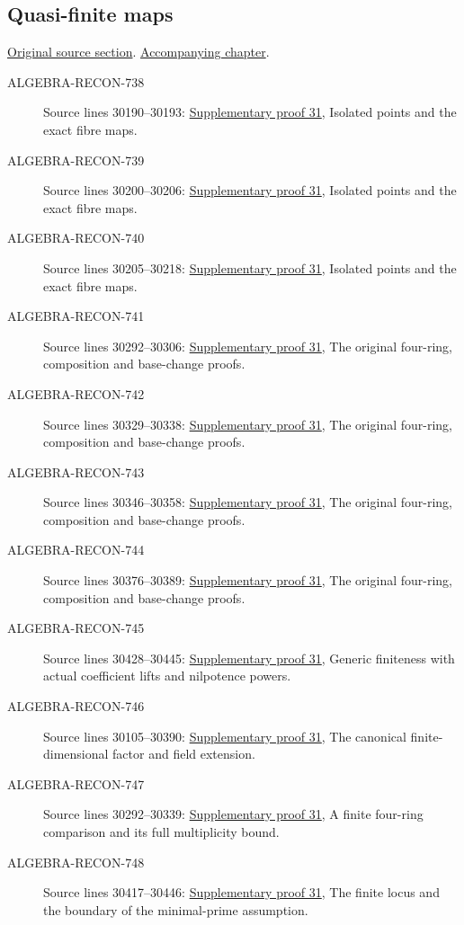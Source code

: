 \subsection{Quasi-finite maps}
\hypertarget{algebra-source-section-quasi-finite}{}
\noindent\href{https://github.com/stacks/stacks-project/blob/a04446e57ec1fbc252a871afcec7752fb2807b14/algebra.tex\#L30093}{Original source section}. \href{algebra.pdf\#nameddest=section-quasi-finite}{Accompanying chapter}.

\begin{description}
\item[ALGEBRA-RECON-738] Source lines 30190--30193: \hyperlink{algebra_quasifinite_notes_20260928}{Supplementary proof 31}, Isolated points and the exact fibre maps.
\item[ALGEBRA-RECON-739] Source lines 30200--30206: \hyperlink{algebra_quasifinite_notes_20260928}{Supplementary proof 31}, Isolated points and the exact fibre maps.
\item[ALGEBRA-RECON-740] Source lines 30205--30218: \hyperlink{algebra_quasifinite_notes_20260928}{Supplementary proof 31}, Isolated points and the exact fibre maps.
\item[ALGEBRA-RECON-741] Source lines 30292--30306: \hyperlink{algebra_quasifinite_notes_20260928}{Supplementary proof 31}, The original four-ring, composition and base-change proofs.
\item[ALGEBRA-RECON-742] Source lines 30329--30338: \hyperlink{algebra_quasifinite_notes_20260928}{Supplementary proof 31}, The original four-ring, composition and base-change proofs.
\item[ALGEBRA-RECON-743] Source lines 30346--30358: \hyperlink{algebra_quasifinite_notes_20260928}{Supplementary proof 31}, The original four-ring, composition and base-change proofs.
\item[ALGEBRA-RECON-744] Source lines 30376--30389: \hyperlink{algebra_quasifinite_notes_20260928}{Supplementary proof 31}, The original four-ring, composition and base-change proofs.
\item[ALGEBRA-RECON-745] Source lines 30428--30445: \hyperlink{algebra_quasifinite_notes_20260928}{Supplementary proof 31}, Generic finiteness with actual coefficient lifts and nilpotence powers.
\item[ALGEBRA-RECON-746] Source lines 30105--30390: \hyperlink{algebra_quasifinite_notes_20260928}{Supplementary proof 31}, The canonical finite-dimensional factor and field extension.
\item[ALGEBRA-RECON-747] Source lines 30292--30339: \hyperlink{algebra_quasifinite_notes_20260928}{Supplementary proof 31}, A finite four-ring comparison and its full multiplicity bound.
\item[ALGEBRA-RECON-748] Source lines 30417--30446: \hyperlink{algebra_quasifinite_notes_20260928}{Supplementary proof 31}, The finite locus and the boundary of the minimal-prime assumption.
\end{description}

